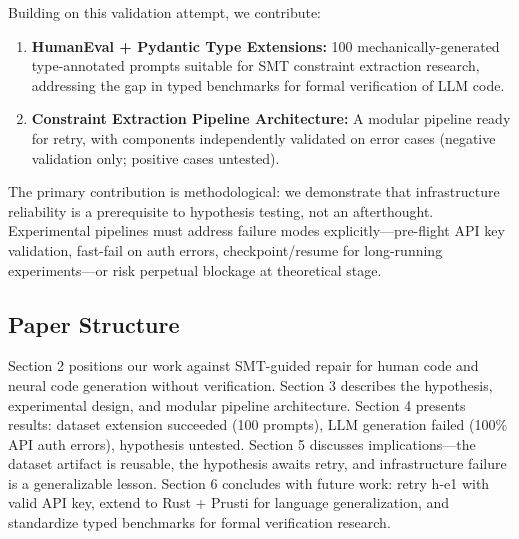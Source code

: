 Building on this validation attempt, we contribute:

\begin{enumerate}
\item \textbf{HumanEval + Pydantic Type Extensions:} 100 mechanically-generated type-annotated prompts suitable for SMT constraint extraction research, addressing the gap in typed benchmarks for formal verification of LLM code.

\item \textbf{Constraint Extraction Pipeline Architecture:} A modular pipeline ready for retry, with components independently validated on error cases (negative validation only; positive cases untested).
\end{enumerate}

The primary contribution is methodological: we demonstrate that infrastructure reliability is a prerequisite to hypothesis testing, not an afterthought. Experimental pipelines must address failure modes explicitly---pre-flight API key validation, fast-fail on auth errors, checkpoint/resume for long-running experiments---or risk perpetual blockage at theoretical stage.

\subsection{Paper Structure}

Section 2 positions our work against SMT-guided repair for human code and neural code generation without verification. Section 3 describes the hypothesis, experimental design, and modular pipeline architecture. Section 4 presents results: dataset extension succeeded (100 prompts), LLM generation failed (100\% API auth errors), hypothesis untested. Section 5 discusses implications---the dataset artifact is reusable, the hypothesis awaits retry, and infrastructure failure is a generalizable lesson. Section 6 concludes with future work: retry h-e1 with valid API key, extend to Rust + Prusti for language generalization, and standardize typed benchmarks for formal verification research.
